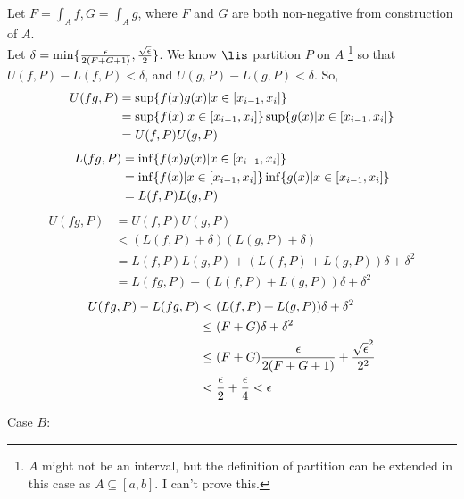         Let $F = \int_A f, G = \int_A g$,
        where $F$ and $G$ are both non-negative from construction of $A$.
        \\
        Let $\delta = \min\{ \frac{\epsilon}{2(F+G+1)}, \frac{\sqrt{\epsilon}}{2} \}$.
        We know $\lis$ partition $P$ on $A$
        \footnote{
            $A$ might not be an interval, 
            but the definition of partition can be extended in this case
            as $A \subseteq [a,b]$.
            I can't prove this.
        }
        so that 
        $U(f,P) - L(f,P) < \delta$, and
        $U(g,P) - L(g,P) < \delta$.
        So, 
        \begin{align*}
            U(fg,P) 
            &= \sup\{ f(x)g(x) | x \in [x_{i-1}, x_i] \}\\
            &= \sup\{ f(x) | x \in [x_{i-1}, x_i] \}
                \sup\{ g(x) | x \in [x_{i-1}, x_i] \}\\
            &= U(f,P)U(g,P)
        \end{align*}
        \begin{align*}
            L(fg,P) 
            &= \inf\{ f(x)g(x) | x \in [x_{i-1}, x_i] \}\\
            &=\inf\{ f(x) | x \in [x_{i-1}, x_i] \}
                \inf\{ g(x) | x \in [x_{i-1}, x_i] \}\\
            &= L(f,P)L(g,P)
        \end{align*}
        \begin{align*}
            U(fg,P) 
            &= U(f,P)U(g,P) \\
            &< (L(f,P) + \delta) (L(g,P) + \delta) \\
            &= L(f,P)L(g,P) + (L(f,P)+L(g,P))\delta + \delta^2 \\
            &= L(fg,P) + (L(f,P)+L(g,P))\delta + \delta^2
        \end{align*}
        \begin{align*}
            U(fg,P) - L(fg,P)
            &< (L(f,P)+L(g,P))\delta + \delta^2\\
            &\leq (F + G)\delta + \delta^2\\
            &\leq (F + G)\frac{\epsilon}{2(F+G+1)} + \frac{\sqrt{\epsilon}^2}{2^2}\\
            &< \frac{\epsilon}{2} + \frac{\epsilon}{4} < \epsilon
        \end{align*}



        Case $B$:

